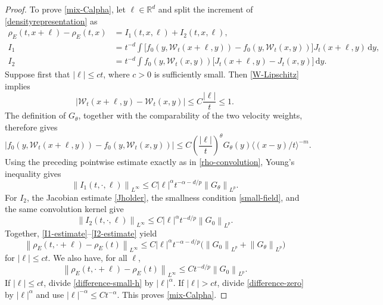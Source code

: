 \documentclass[11pt]{article}
\newcommand{\R}{\mathbb R}
\newcommand{\la}{\langle}
\newcommand{\ra}{\rangle}
\newcommand{\norm}[1]{\left\lVert #1\right\rVert}
\newcommand{\abs}[1]{\left\lvert #1\right\rvert}
\newcommand{\dd}{\,\mathrm d}
\begin{document}
\begin{proof}
To prove \eqref{mix-Calpha}, let $\ell\in\R^d$ and split the increment of
\eqref{densityrepresentation} as
\begin{align}
 \rho_E(t,x+\ell)-\rho_E(t,x)
 &=I_1(t,x,\ell)+I_2(t,x,\ell),\label{rho-increment-split}\\
 I_1
 &=t^{-d}\int
 \bigl[f_0(y,\mathcal W_t(x+\ell,y))
       -f_0(y,\mathcal W_t(x,y))\bigr]
 J_t(x+\ell,y)\dd y,\nonumber\\
 I_2
 &=t^{-d}\int f_0(y,\mathcal W_t(x,y))
 \bigl[J_t(x+\ell,y)-J_t(x,y)\bigr]\dd y.\nonumber
\end{align}
Suppose first that $\abs \ell\leq c t$, where $c>0$ is sufficiently small.
Then
\eqref{W-Lipschitz} implies
\begin{equation*}
 \abs{\mathcal W_t(x+\ell,y)-\mathcal W_t(x,y)}
 \leq C\frac{\abs \ell}{t}\leq1.
\end{equation*}
The definition of $G_\theta$, together with the comparability of the two
velocity weights, therefore gives
\begin{equation*}
 \abs{f_0(y,\mathcal W_t(x+\ell,y))
       -f_0(y,\mathcal W_t(x,y))}
 \leq C\left(\frac{\abs \ell}{t}\right)^\theta
 G_\theta(y)\la(x-y)/t\ra^{-m}.
\end{equation*}
Using the preceding pointwise estimate exactly as in
\eqref{rho-convolution}, Young's inequality gives
 \begin{equation}\label{I1-estimate}
 \norm{I_1(t,\cdot,\ell)}_{L^\infty}
 \leq C\abs\ell^\alpha t^{-\alpha-d/p}\norm{G_\theta}_{L^p}.
\end{equation} 
For $I_2$, the Jacobian estimate \eqref{Jholder}, the smallness condition
\eqref{small-field}, and the same convolution kernel give
 \begin{equation}\label{I2-estimate}
 \norm{I_2(t,\cdot,\ell)}_{L^\infty}
 \leq C\abs\ell^\alpha t^{-d/p}\norm{G_0}_{L^p}.
\end{equation} 
Together, \eqref{I1-estimate}--\eqref{I2-estimate} yield
 \begin{equation}\label{difference-small-h}
 \norm{\rho_E(t,\cdot+\ell)-\rho_E(t)}_{L^\infty}
 \leq C\abs \ell^\alpha t^{-\alpha-d/p}
       \big(\norm{G_0}_{L^p}+\norm{G_\theta}_{L^p}\big)
\end{equation} 
for $\abs \ell\leq ct$.  We also have, for all $\ell$,
 \begin{equation}\label{difference-zero}
 \norm{\rho_E(t,\cdot+\ell)-\rho_E(t)}_{L^\infty}
 \leq Ct^{-d/p}\norm{G_0}_{L^p}.
\end{equation} 
If $\abs \ell\leq ct$, divide \eqref{difference-small-h} by
$\abs \ell^\alpha$. If $\abs \ell>ct$, divide \eqref{difference-zero} by
$\abs \ell^\alpha$ and use $\abs \ell^{-\alpha}\leq Ct^{-\alpha}$.
This proves \eqref{mix-Calpha}.
\end{proof}
\end{document}
